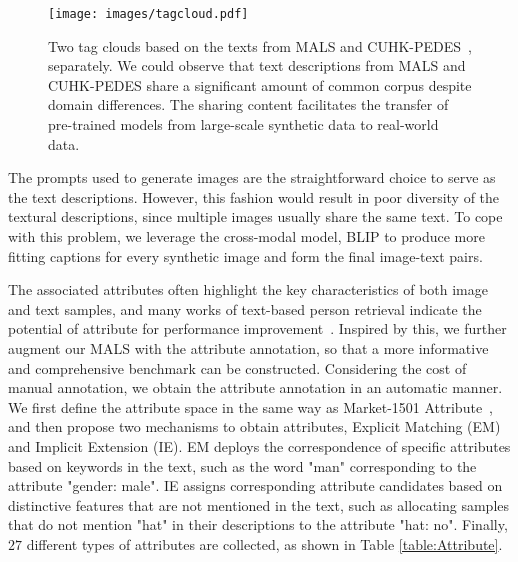 \documentclass[sigconf]{acmart}
\begin{document}
\begin{figure*}[t]
\vspace{-.1in}
\begin{center}
     \texttt{[image: images/tagcloud.pdf]}     
\end{center}
\vspace{-.20in}
      \caption{Two tag clouds based on the texts from MALS  and CUHK-PEDES~\cite{li2017identity}, separately. We could observe that text descriptions from MALS and CUHK-PEDES share a significant amount of common corpus despite domain differences. The sharing content facilitates the transfer of pre-trained models from large-scale synthetic data to real-world data.
      }\label{fig:tag}
      \vspace{-.1in}
\end{figure*}


The prompts used to generate images are the straightforward choice to serve as the text descriptions.
However, this fashion would result in poor diversity of the textural descriptions, since multiple images usually share the same text. 
To cope with this problem, we leverage the cross-modal model, BLIP \cite{li2022blip} to produce more fitting captions for every synthetic image and form the final image-text pairs.


\vspace{-0.08cm}
The associated attributes often highlight the key characteristics of both image and text samples, and many works of text-based person retrieval indicate the potential of attribute for performance improvement~\cite{shu2023see, ding2021semantically, chen2022tipcb}. Inspired by this, we further augment our MALS with the attribute annotation, so that a more informative and comprehensive benchmark can be constructed. Considering the cost of manual annotation, we obtain the attribute annotation in an automatic manner.
We first define the attribute space in the same way as Market-1501 Attribute~\cite{lin2019improving}, and then propose two mechanisms to obtain attributes, Explicit Matching (EM) and Implicit Extension (IE). 
EM deploys the correspondence of specific attributes based on keywords in the text, such as the word "man" corresponding to the attribute "gender: male". 
IE assigns corresponding attribute candidates based on distinctive features that are not mentioned in the text, such as allocating samples that do not mention "hat" in their descriptions to the attribute "hat: no". 
Finally, $27$ different types of attributes are collected, as shown in Table \ref{table:Attribute}.
\end{document}
